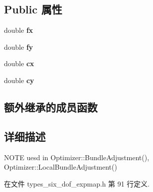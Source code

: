 \subsection*{Public 属性}
\begin{DoxyCompactItemize}
\item 
\hypertarget{classg2o_1_1EdgeSE3ProjectXYZ_a6af0a48bd4e21d060585d7ee9c1ca1ef}{double {\bfseries fx}}\label{classg2o_1_1EdgeSE3ProjectXYZ_a6af0a48bd4e21d060585d7ee9c1ca1ef}

\item 
\hypertarget{classg2o_1_1EdgeSE3ProjectXYZ_af5f931cd13ef318a3f42f54aa57b9466}{double {\bfseries fy}}\label{classg2o_1_1EdgeSE3ProjectXYZ_af5f931cd13ef318a3f42f54aa57b9466}

\item 
\hypertarget{classg2o_1_1EdgeSE3ProjectXYZ_ace052104b07ec272eb5f254254ead5e5}{double {\bfseries cx}}\label{classg2o_1_1EdgeSE3ProjectXYZ_ace052104b07ec272eb5f254254ead5e5}

\item 
\hypertarget{classg2o_1_1EdgeSE3ProjectXYZ_af590c37d535ce7e71be5ce4ae368e9c1}{double {\bfseries cy}}\label{classg2o_1_1EdgeSE3ProjectXYZ_af590c37d535ce7e71be5ce4ae368e9c1}

\end{DoxyCompactItemize}
\subsection*{额外继承的成员函数}


\subsection{详细描述}
N\-O\-T\-E uesd in Optimizer\-::\-Bundle\-Adjustment(), Optimizer\-::\-Local\-Bundle\-Adjustment() 

在文件 types\-\_\-six\-\_\-dof\-\_\-expmap.\-h 第 91 行定义.



